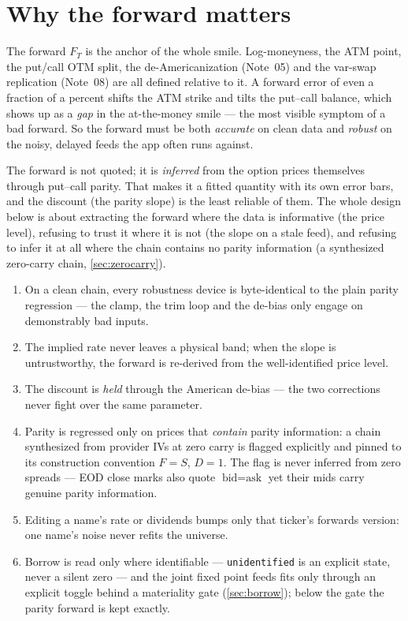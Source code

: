 \documentclass[11pt]{article}
\begin{document}
\section{Why the forward matters}
\label{sec:why}

The forward $F_T$ is the anchor of the whole smile. Log-moneyness, the ATM point,
the put/call OTM split, the de-Americanization (Note~05) and the var-swap
replication (Note~08) are all defined relative to it. A forward error of even a
fraction of a percent shifts the ATM strike and tilts the put--call balance, which
shows up as a \emph{gap} in the at-the-money smile --- the most visible symptom of
a bad forward. So the forward must be both \emph{accurate} on clean data and
\emph{robust} on the noisy, delayed feeds the app often runs against.

\begin{heuristic}
The forward is not quoted; it is \emph{inferred} from the option prices themselves
through put--call parity. That makes it a fitted quantity with its own error bars,
and the discount (the parity slope) is the least reliable of them. The whole design
below is about extracting the forward where the data is informative (the price
level), refusing to trust it where it is not (the slope on a stale feed), and
refusing to infer it at all where the chain contains no parity information
(a synthesized zero-carry chain, \cref{sec:zerocarry}).
\end{heuristic}

\begin{invariant}
\begin{enumerate}[leftmargin=1.6em]
\item On a clean chain, every robustness device is byte-identical to the plain
parity regression --- the clamp, the trim loop and the de-bias only engage on
demonstrably bad inputs.
\item The implied rate never leaves a physical band; when the slope is
untrustworthy, the forward is re-derived from the well-identified price level.
\item The discount is \emph{held} through the American de-bias --- the two
corrections never fight over the same parameter.
\item Parity is regressed only on prices that \emph{contain} parity
information: a chain synthesized from provider IVs at zero carry is flagged
explicitly and pinned to its construction convention $F=S$, $D=1$. The flag
is never inferred from zero spreads --- EOD close marks also quote
$\text{bid}=\text{ask}$ yet their mids carry genuine parity information.
\item Editing a name's rate or dividends bumps only that ticker's forwards
version: one name's noise never refits the universe.
\item Borrow is read only where identifiable --- \texttt{unidentified} is an
explicit state, never a silent zero --- and the joint fixed point feeds fits
only through an explicit toggle behind a materiality gate
(\cref{sec:borrow}); below the gate the parity forward is kept exactly.
\end{enumerate}
\end{invariant}
\end{document}

